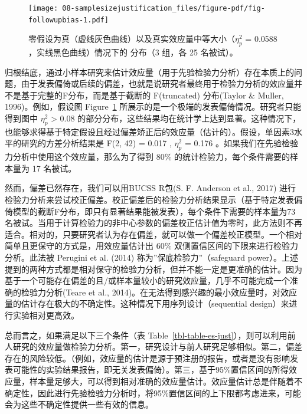 \documentclass[
  letterpaper,
  DIV=11,
  numbers=noendperiod]{scrreprt}
\begin{document}
\begin{figure}

{\centering \texttt{[image: 08-samplesizejustification\_files/figure-pdf/fig-followupbias-1.pdf]}

}

\caption{\label{fig-followupbias}零假设为真（虚线灰色曲线）以及真实效应量中等大小（\(\eta_p^2\)
= 0.0588 ，实线黑色曲线）情况下的 分布（3 组，各 25 名被试）。}

\end{figure}

归根结底，通过小样本研究来估计效应量（用于先验检验力分析）存在本质上的问题，由于发表偏倚或后续的偏差，也就是说研究者最终用于检验力分析的效应量并不是基于完整的F分布，而是基于截断的
F(truncated) 分布(Taylor \& Muller, 1996)。例如，假设图
Figure~\ref{fig-followupbias}
所展示的是一个极端的发表偏倚情况。研究者只能得到图中 \(\eta_p^2\)
\textgreater{} 0.08
的部分分布，这些结果均在统计学上达到显著。这种情况下，也能够求得基于特定假设且经过偏差矫正后的效应量（估计的）。假设，单因素3水平的研究的方差分析结果是
F(2, 42) = 0.017 , \(\eta_p^2\) = 0.176
。如果我们在先验检验力分析中使用这个效应量，那么为了得到 80\%
的统计检验力，每个条件需要的样本量为 17 名被试。

然而，偏差已然存在，我们可以用BUCSS R包(S. F. Anderson et al., 2017)
进行检验力分析来尝试校正偏差。校正偏差后的检验力分析结果显示（基于特定发表偏倚模型的截断F分布，即只有显著结果能被发表），每个条件下需要的样本量为73名被试。当用于计算检验力的非中心参数的偏差校正估计值为零时，此方法则不再适合。相对的，只要研究者认为存在偏差，就可以做一个偏差校正模型。一个相对简单且更保守的方式是，用效应量估计出
60\% 双侧置信区间的下限来进行检验力分析。此法被 Perugini et al. (2014)
称为''保底检验力''（safeguard
power）。上述提到的两种方式都是相对保守的检验力分析，但并不能一定是更准确的估计。因为基于一个可能存在偏差的且/或样本量较小的研究效应量，几乎不可能完成一个准确的检验力分析(Teare
et al.,
2014)。在无法得到感兴趣的最小效应量时，对效应量的估计存在极大的不确定性。这种情况下用序列设计（sequential
design）来进行实验相对更高效。

总而言之，如果满足以下三个条件（表
Table~\ref{tbl-table-es-just}），则可以利用前人研究的效应量做检验力分析。第一，研究设计与前人研究足够相似。第二，偏差存在的风险较低。（例如，效应量的估计是源于预注册的报告，或者是没有影响发表可能性的实验结果报告，即无关发表偏倚）。第三，基于95\%置信区间的所得效应量，样本量足够大，可以得到相对准确的效应量估计。效应量估计总是伴随着不确定性，因此进行先验检验力分析时，将95\%置信区间的上下限都考虑进来，可能会为这些不确定性提供一些有效的信息。
\end{document}
